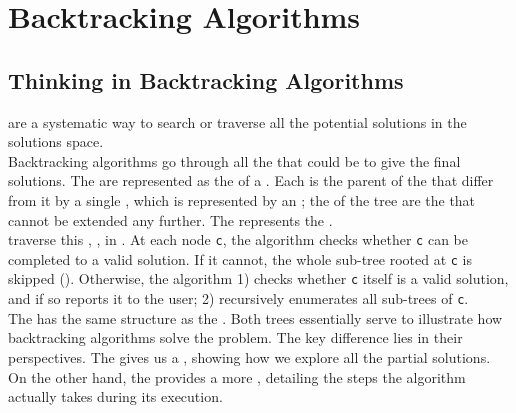 \chapter{Backtracking Algorithms}\label{chap:backtracking}
\section{Thinking in Backtracking Algorithms}
{\color{blue}{Backtracking algorithms}} are a systematic way to search or traverse all the potential solutions in the solutions space. \\

Backtracking algorithms go through all the {\color{blue}{partial solutions}} that could be {\color{blue}{incrementally}} {\color{blue}{completed}} to give the final solutions. The {\color{blue}{partial solutions}} are represented as the {\color{blue}{nodes}} of a {}. Each {\color{blue}{partial solution}} is the parent of the {\color{blue}{partial solutions}} that differ from it by a single {\color{blue}{extension step}}, which is represented by an {\color{blue}{edge}}; the {\color{blue}{leaves}} of the tree are the {\color{blue}{partial solutions}} that cannot be extended any further. The {\color{blue}{depth of a node}} represents the {\color{blue}{level of recursion}}.\\

{\color{blue}{Backtracking algorithms}} traverse this {\color{blue}{potential search tree}} {\color{blue}{recursively}}, {\color{blue}{from the root down}}, in {\color{blue}{depth-first order}}. At each node {\colorbox{CodeBackground}{\lstinline|c|}}, the algorithm checks whether {\colorbox{CodeBackground}{\lstinline|c|}} can be completed to a valid solution. If it cannot, the whole sub-tree rooted at {\colorbox{CodeBackground}{\lstinline|c|}} is skipped ({\color{blue}{pruned}}). Otherwise, the algorithm 1) checks whether {\colorbox{CodeBackground}{\lstinline|c|}} itself is a valid solution, and if so reports it to the user; 2) recursively enumerates all sub-trees of {\colorbox{CodeBackground}{\lstinline|c|}}. \\

The {} has the same structure as the {}. Both trees essentially serve to illustrate how backtracking algorithms solve the problem. The key difference lies in their perspectives. The {\color{blue}{potential search tree}} gives us a {\color{blue}{high-level, problem-oriented view}}, showing how we explore all the partial solutions. On the other hand, the {\color{blue}{activation tree}} provides a more {\color{blue}{low-level, execution-oriented view}}, detailing the steps the algorithm actually takes during its execution.

